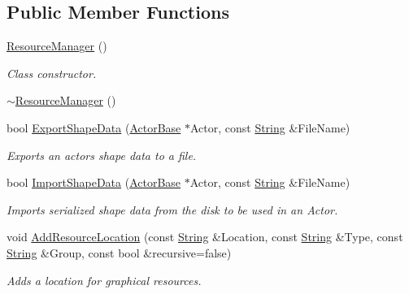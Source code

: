 \subsection*{Public Member Functions}
\begin{DoxyCompactItemize}
\item 
\hyperlink{classphys_1_1ResourceManager_af114d84fa357432db4184bfd322495b6}{ResourceManager} ()
\begin{DoxyCompactList}\small\item\em Class constructor. \item\end{DoxyCompactList}\item 
\hyperlink{classphys_1_1ResourceManager_a426d4d684a9ecf98359362243ce01072}{$\sim$ResourceManager} ()
\item 
bool \hyperlink{classphys_1_1ResourceManager_a9511ec29e5c732602b1495173abf56ef}{ExportShapeData} (\hyperlink{classphys_1_1ActorBase}{ActorBase} $\ast$Actor, const \hyperlink{namespacephys_aa03900411993de7fbfec4789bc1d392e}{String} \&FileName)
\begin{DoxyCompactList}\small\item\em Exports an actors shape data to a file. \item\end{DoxyCompactList}\item 
bool \hyperlink{classphys_1_1ResourceManager_a6fb3434f5d7be221e7a474765c625ad9}{ImportShapeData} (\hyperlink{classphys_1_1ActorBase}{ActorBase} $\ast$Actor, const \hyperlink{namespacephys_aa03900411993de7fbfec4789bc1d392e}{String} \&FileName)
\begin{DoxyCompactList}\small\item\em Imports serialized shape data from the disk to be used in an Actor. \item\end{DoxyCompactList}\item 
void \hyperlink{classphys_1_1ResourceManager_a0d7d3adce2ad4c70a3e867396e17b090}{AddResourceLocation} (const \hyperlink{namespacephys_aa03900411993de7fbfec4789bc1d392e}{String} \&Location, const \hyperlink{namespacephys_aa03900411993de7fbfec4789bc1d392e}{String} \&Type, const \hyperlink{namespacephys_aa03900411993de7fbfec4789bc1d392e}{String} \&Group, const bool \&recursive=false)
\begin{DoxyCompactList}\small\item\em Adds a location for graphical resources. \item\end{DoxyCompactList}\item 

\end{DoxyCompactItemize}
